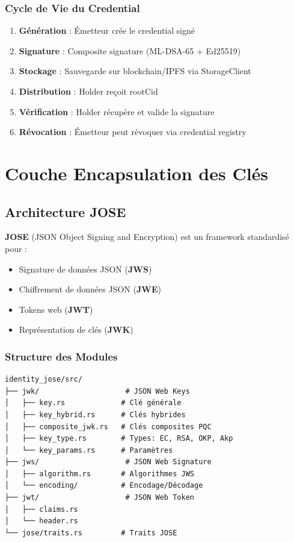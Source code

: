 \documentclass[12pt,a4paper]{report}
\begin{document}
\subsection{Cycle de Vie du Credential}

\begin{enumerate}
  \item \textbf{Génération} : Émetteur crée le credential signé
  \item \textbf{Signature} : Composite signature (ML-DSA-65 + Ed25519)
  \item \textbf{Stockage} : Sauvegarde sur blockchain/IPFS via StorageClient
  \item \textbf{Distribution} : Holder reçoit rootCid
  \item \textbf{Vérification} : Holder récupère et valide la signature
  \item \textbf{Révocation} : Émetteur peut révoquer via credential registry
\end{enumerate}

\chapter{Couche Encapsulation des Clés}

\section{Architecture JOSE}

\textbf{JOSE} (JSON Object Signing and Encryption) est un framework standardisé pour :
\begin{itemize}
  \item Signature de données JSON (\textbf{JWS})
  \item Chiffrement de données JSON (\textbf{JWE})
  \item Tokens web (\textbf{JWT})
  \item Représentation de clés (\textbf{JWK})
\end{itemize}

\subsection{Structure des Modules}

\begin{lstlisting}
identity_jose/src/
├── jwk/                    # JSON Web Keys
│   ├── key.rs             # Clé générale
│   ├── key_hybrid.rs      # Clés hybrides
│   ├── composite_jwk.rs   # Clés composites PQC
│   ├── key_type.rs        # Types: EC, RSA, OKP, Akp
│   └── key_params.rs      # Paramètres
├── jws/                    # JSON Web Signature
│   ├── algorithm.rs       # Algorithmes JWS
│   └── encoding/          # Encodage/Décodage
├── jwt/                    # JSON Web Token
│   ├── claims.rs
│   └── header.rs
└── jose/traits.rs         # Traits JOSE
\end{lstlisting}
\end{document}
